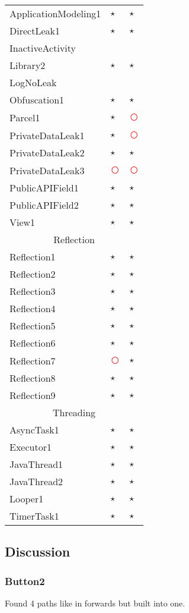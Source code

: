 \documentclass[../draft.tex]{subfiles}
\newcommand{\fn}{\textcolor{red}{\textcircled{ }}}
\newcommand{\tp}[0]{\textcircled{$\star$}}
\newcommand{\tsub}[1]{\multicolumn{3}{c}{#1}\\\hline}
\begin{document}
\begin{longtable}{l | l | l}
        ApplicationModeling1 & \tp & \tp\\
        DirectLeak1 & \tp & \tp\\
        InactiveActivity &  & \\
        Library2 & \tp & \tp\\
        LogNoLeak & & \\
        Obfuscation1 & \tp & \tp\\
        Parcel1 & \tp & \fn\\
        PrivateDataLeak1 & \tp & \fn\\
        PrivateDataLeak2 & \tp & \tp\\
        PrivateDataLeak3 & \fn & \fn\\
        PublicAPIField1 & \tp & \tp\\
        PublicAPIField2 & \tp & \tp\\
        View1 & \tp & \tp\\
        \hline
        \tsub{Reflection}
        Reflection1 & \tp & \tp\\
        Reflection2 & \tp & \tp\\
        Reflection3 & \tp & \tp\\
        Reflection4 & \tp & \tp\\
        Reflection5 & \tp & \tp\\
        Reflection6 & \tp & \tp\\
        Reflection7 & \fn & \tp\\
        Reflection8 & \tp & \tp\\
        Reflection9 & \tp & \tp\\
        \hline
        \tsub{Threading}
        AsyncTask1 & \tp & \tp\\
        Executor1 & \tp & \tp\\
        JavaThread1 & \tp & \tp\\
        JavaThread2 & \tp & \tp\\
        Looper1 & \tp & \tp\\
        TimerTask1 & \tp & \tp\\
    \end{longtable}

    \subsection{Discussion}
    \subsubsection{Button2}
    Found 4 paths like in forwards but built into one.
\end{document}
